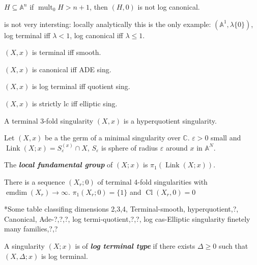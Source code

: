 \begin{exercise}
\label{exercise-moraga-2}
$H\subseteq \mathbb{A}^{n}$ if
$\operatorname{mult}_{0}H>n+1$, then $(H,0)$
is not log canonical.
\end{exercise}

\medskip{}
{is not very intersting:} locally
analytically this is the only example:
$(\mathbb{A}^{1},\lambda \{0\} )$, log
terminal iff $\lambda<1$, log canonical iff
$\lambda\leq 1$.

\medskip{}

$(X,x)$ is terminal iff smooth.

$(X,x)$ is canonical iff ADE sing.

$(X,x)$ is log terminal iff quotient sing.

$(X,x)$ is strictly lc iff elliptic sing.

\begin{theorem}[Reid, 80's]
\label{theorem-moraga-8}
A terminal 3-fold singularity $(X,x)$ is a
hyperquotient singularity.
\end{theorem}

\begin{definition}
\label{definition-moraga-8}
Let $(X,x)$ be a the germ of a minimal
singularity over $\mathbb{C}$. $\varepsilon
>0$ small and
$\operatorname{Link}(X;x)=S_{\varepsilon
}^{(x)} \cap X$, $S_{\varepsilon }$ is sphere
of radius $\varepsilon $ around $x$ in
$\mathbb{A}^{N}$.

The \textit{\textbf{local fundamental group}}
of  $(X;x)$ is
$\pi_{1}(\operatorname{Link}(X;x)) $.
\end{definition}

\begin{theorem}[Koll\'ar, 2010]
\label{theorem-moraga-9}
There is a sequence $(X_{r};0)$ of terminal
4-fold singularities with
$\operatorname{emdim}(X_ {r})\to \infty$.
$\pi_{1}(X_{r};0) =\{1\} $ and
$\operatorname{Cl}(X_{r},0)=0$
\end{theorem}

{*Some table classifing dimensions 2,3,4,
Terminal-smooth, hyperquotient,?, Canonical,
Ade-?,?,?, log termi-quotient,?,?, log
cas-Elliptic singularity finetely many
families,?,?}

\begin{definition}
\label{definition-moraga-9}
A singularity $(X;x)$ is of
\textit{\textbf{log terminal type}} if there
exists $\Delta \geq 0$ such that
$(X,\Delta;x)$ is log terminal.
\end{definition}

